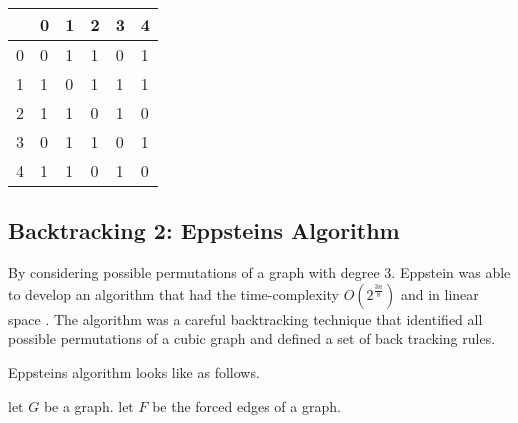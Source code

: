 \begin{table}[H]
    \centering
    \begin{tabular}{l | lllll}
          & 0 & 1 & 2 & 3 & 4  \\
        \hline
        0 & 0 & 1 & 1 & 0 & 1  \\
        1 & 1 & 0 & 1 & 1 & 1  \\
        2 & 1 & 1 & 0 & 1 & 0  \\
        3 & 0 & {\cellcolor[rgb]{0.933,0.804,0.804}}1 & 1 & 0 & 1  \\
        4 & 1 & 1 & 0 & 1 & 0 
    \end{tabular}
\end{table}


\subsection{Backtracking 2: Eppsteins Algorithm}

By considering possible permutations of a graph with degree 3. Eppstein was able
to develop an algorithm that had the time-complexity $O(2^{\frac{3n}{8}})$ and
in linear space \cite{Epps2007}. The algorithm was a careful backtracking
technique that identified all possible permutations of a cubic graph and defined
a set of back tracking rules.

Eppsteins algorithm looks like as follows.

$\text{let } G$ be a graph.
$\text{let } F$ be the forced edges of a graph.

